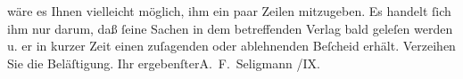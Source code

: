                wäre es Ihnen vielleicht möglich, ihm ein {\pb}paar Zeilen mitzugeben. Es handelt{ }ſich ihm nur darum, daß{ }ſeine Sachen in dem
               betreffenden Verlag bald geleſen werden u. er in kurzer Zeit einen zuſagenden oder
               ablehnenden Beſcheid erhält. Verzeihen Sie die Beläſtigung.\pend
           \pstart Ihr ergebenſter\spacefill\mbox{A. F. Seligmann}\pend{}
/IX.\pend
           \endnumbering{}  \newcommand{\dateiname}{L01236}\newcommand{\titel}{Adalbert Seligmann an Arthur Schnitzler, 30. 9. [1902?]}\newcommand{\editorInnen}{Martin Anton Müller und Gerd-Hermann Susen}
